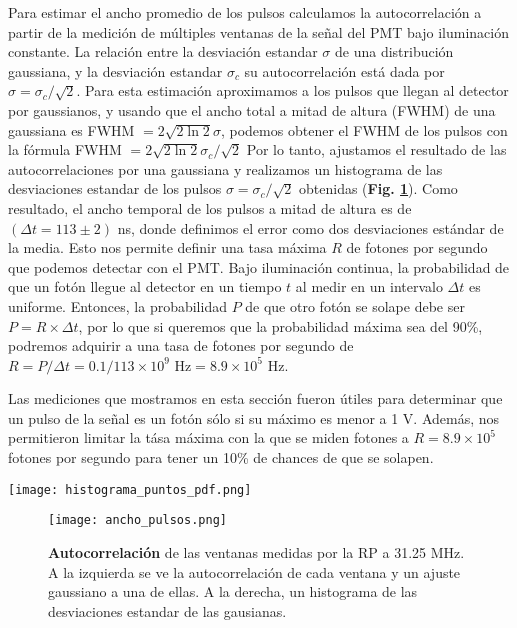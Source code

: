 Para estimar el ancho promedio de los pulsos calculamos la autocorrelación a partir de la medición de múltiples ventanas de la señal del PMT bajo iluminación constante.
La relación entre la desviación estandar $\sigma$ de una distribución gaussiana, y la desviación estandar $\sigma_c$ su autocorrelación está dada por $\sigma = \sigma_c/\sqrt{2}$.
Para esta estimación aproximamos a los pulsos que llegan al detector por gaussianos, y usando que el ancho total a mitad de altura (FWHM) de una gaussiana es FWHM $= 2 \sqrt{2 \ln{2}}\sigma$, podemos obtener el FWHM de los pulsos con la fórmula FWHM $= 2 \sqrt{2 \ln{2}}\sigma_c / \sqrt{2}$
Por lo tanto, ajustamos el resultado de las autocorrelaciones por una gaussiana y realizamos un histograma de las desviaciones estandar de los pulsos $\sigma = \sigma_c / \sqrt{2}$ obtenidas (\textbf{Fig. \ref{fig:ancho_pulsos}}).
Como resultado, el ancho temporal de los pulsos a mitad de altura es de $(\Delta t = 113 \pm 2)$ ns, donde definimos el error como dos desviaciones estándar de la media.
Esto nos permite definir una tasa máxima $R$ de fotones por segundo que podemos detectar con el PMT.
Bajo iluminación continua, la probabilidad de que un fotón llegue al detector en un tiempo $t$ al medir en un intervalo $\Delta t$ es uniforme.
Entonces, la probabilidad $P$ de que otro fotón se solape debe ser $P = R \times \Delta t$, por lo que si queremos que la probabilidad máxima sea del 90\%, podremos adquirir a una tasa de fotones por segundo de $R = P/\Delta t = 0.1/113 \times 10^9$ Hz$ = 8.9 \times 10^5$ Hz.

Las mediciones que mostramos en esta sección fueron útiles para determinar que un pulso de la señal es un fotón sólo si su máximo es menor a 1 V.
Además, nos permitieron limitar la tása máxima con la que se miden fotones a $R = 8.9 \times 10^5$ fotones por segundo para tener un 10\% de chances de que se solapen.

\begin{SCfigure}
    \centering
    \texttt{[image: histograma\_puntos\_pdf.png]}
    \caption{\textbf{Histograma de voltajes} de una señal del PMT tomada con la RP a 31.25 MHz. El eje vertical está en escala logarítmica.}
    \label{fig:histograma_puntos}
\end{SCfigure}


\begin{figure}
    \texttt{[image: ancho\_pulsos.png]}
    \caption{\textbf{Autocorrelación} de las ventanas medidas por la RP a 31.25 MHz. A la izquierda se ve la autocorrelación de cada ventana y un ajuste gaussiano a una de ellas. A la derecha, un histograma de las desviaciones estandar de las gausianas.}
    \label{fig:ancho_pulsos}
\end{figure}

